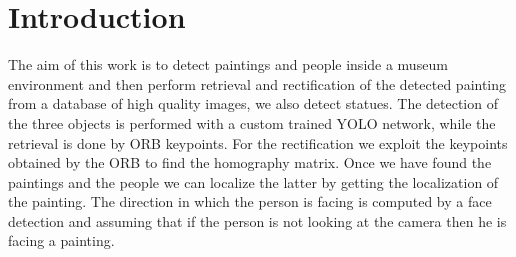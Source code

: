 \section{Introduction}
The aim of this work is to detect paintings and people inside a museum environment and then perform retrieval and rectification of the detected painting from a database of high quality images, we also detect statues. The detection of the three objects is performed with a custom trained YOLO network, while the retrieval is done by ORB keypoints. For the rectification we exploit the keypoints obtained by the ORB to find the homography matrix. Once we have found the paintings and the people we can localize the latter by getting the localization of the painting. The direction in which the person is facing is computed by a face detection and assuming that if the person is not looking at the camera then he is facing a painting.
